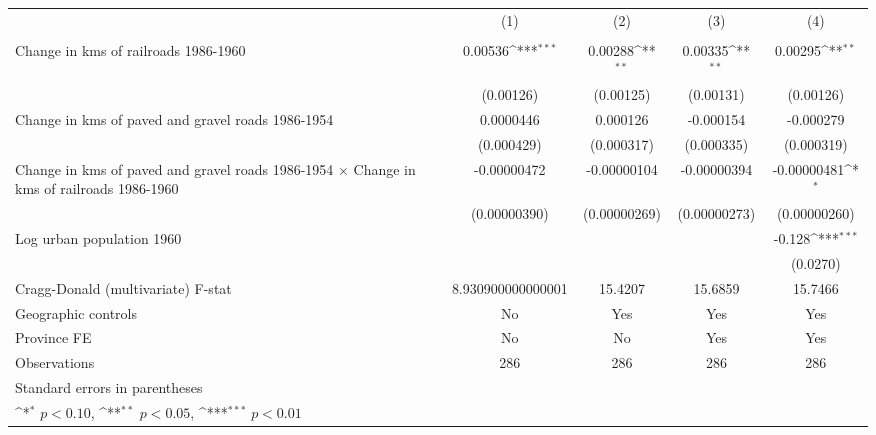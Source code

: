 {
\def\sym#1{\ifmmode^{#1}\else\(^{#1}\)\fi}
\begin{tabular}{l*{4}{c}}
\hline\hline
                &\multicolumn{1}{c}{(1)}&\multicolumn{1}{c}{(2)}&\multicolumn{1}{c}{(3)}&\multicolumn{1}{c}{(4)}\\
                &\multicolumn{1}{c}{}&\multicolumn{1}{c}{}&\multicolumn{1}{c}{}&\multicolumn{1}{c}{}\\
\hline
Change in kms of railroads 1986-1960&  0.00536\sym{***}&  0.00288\sym{**} &  0.00335\sym{**} &  0.00295\sym{**} \\
                &(0.00126)         &(0.00125)         &(0.00131)         &(0.00126)         \\
[1em]
Change in kms of paved and gravel roads 1986-1954&0.0000446         & 0.000126         &-0.000154         &-0.000279         \\
                &(0.000429)         &(0.000317)         &(0.000335)         &(0.000319)         \\
[1em]
Change in kms of paved and gravel roads 1986-1954 $\times$ Change in kms of railroads 1986-1960&-0.00000472         &-0.00000104         &-0.00000394         &-0.00000481\sym{*}  \\
                &(0.00000390)         &(0.00000269)         &(0.00000273)         &(0.00000260)         \\
[1em]
Log urban population 1960&                  &                  &                  &   -0.128\sym{***}\\
                &                  &                  &                  & (0.0270)         \\
\hline
Cragg-Donald (multivariate) F-stat&8.930900000000001         &  15.4207         &  15.6859         &  15.7466         \\
Geographic controls&       No         &      Yes         &      Yes         &      Yes         \\
Province FE     &       No         &       No         &      Yes         &      Yes         \\
Observations    &      286         &      286         &      286         &      286         \\
\hline\hline
\multicolumn{5}{l}{\footnotesize Standard errors in parentheses}\\
\multicolumn{5}{l}{\footnotesize \sym{*} \(p<0.10\), \sym{**} \(p<0.05\), \sym{***} \(p<0.01\)}\\
\end{tabular}
}
